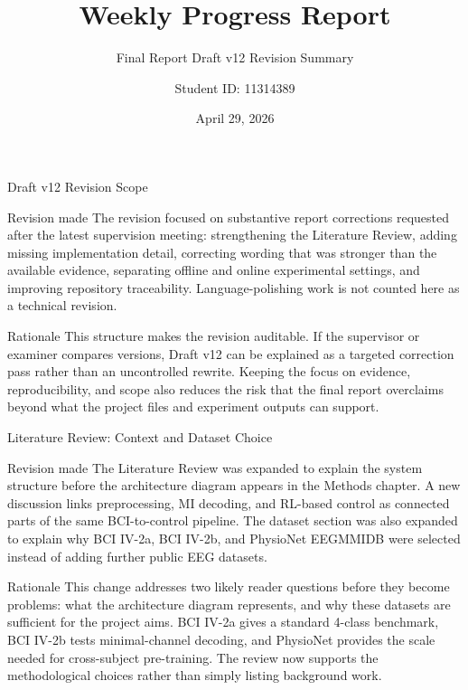 \documentclass[UTF8,aspectratio=169,11pt]{ctexbeamer}
\title{Weekly Progress Report}
\subtitle{Final Report Draft v12 Revision Summary}
\author{Student ID: 11314389}
\institute{BCI Control System Project}
\date{April 29, 2026}
\begin{document}
\begin{frame}[t]{Draft v12 Revision Scope}
\footnotesize

    \begin{block}{Revision made}
        The revision focused on substantive report corrections requested after the latest supervision meeting: strengthening the Literature Review, adding missing implementation detail, correcting wording that was stronger than the available evidence, separating offline and online experimental settings, and improving repository traceability. Language-polishing work is not counted here as a technical revision.
    \end{block}

    \vfill

    \begin{alertblock}{Rationale}
        This structure makes the revision auditable. If the supervisor or examiner compares versions, Draft v12 can be explained as a targeted correction pass rather than an uncontrolled rewrite. Keeping the focus on evidence, reproducibility, and scope also reduces the risk that the final report overclaims beyond what the project files and experiment outputs can support.
    \end{alertblock}

\end{frame}

\begin{frame}[t]{Literature Review: Context and Dataset Choice}
\footnotesize

    \begin{block}{Revision made}
        The Literature Review was expanded to explain the system structure before the architecture diagram appears in the Methods chapter. A new discussion links preprocessing, MI decoding, and RL-based control as connected parts of the same BCI-to-control pipeline. The dataset section was also expanded to explain why BCI IV-2a, BCI IV-2b, and PhysioNet EEGMMIDB were selected instead of adding further public EEG datasets.
    \end{block}

    \vfill

    \begin{alertblock}{Rationale}
        This change addresses two likely reader questions before they become problems: what the architecture diagram represents, and why these datasets are sufficient for the project aims. BCI IV-2a gives a standard 4-class benchmark, BCI IV-2b tests minimal-channel decoding, and PhysioNet provides the scale needed for cross-subject pre-training. The review now supports the methodological choices rather than simply listing background work.
    \end{alertblock}

\end{frame}
\end{document}
